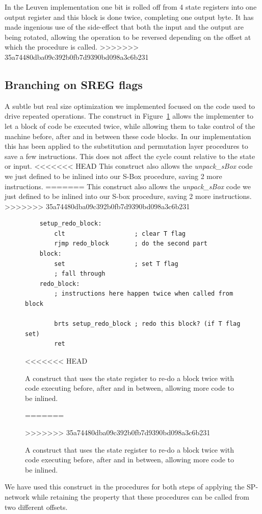 \documentclass[11pt]{article}
\begin{document}
In the Leuven implementation one bit is rolled off from 4 state registers into one output register and this block is done twice, completing one output byte. It has made ingenious use of the side-effect that both the input and the output are being rotated, allowing the operation to be reversed depending on the offset at which the procedure is called.
>>>>>>> 35a74480dba09c392b0fb7d9390bd098a3c6b231

\subsection{Branching on SREG flags}
A subtle but real size optimization we implemented focused on the code used to drive repeated operations.
The construct in Figure~\ref{sreg_redo} allows the implementer to let a block of code be executed twice, while allowing them to take control of the machine before, after and in between these code blocks.
In our implementation this has been applied to the substitution and permutation layer procedures to save a few instructions.
This does not affect the cycle count relative to the state or input.
<<<<<<< HEAD
This construct also allows the \textit{unpack\_sBox} code we just defined to be inlined into our S-Box procedure, saving 2 more instructions.
=======
This construct also allows the \textit{unpack\_sBox} code we just defined to be inlined into our S-box procedure, saving 2 more instructions.
>>>>>>> 35a74480dba09c392b0fb7d9390bd098a3c6b231

\begin{figure}
	\begin{lstlisting}
	setup_redo_block:
		clt                   ; clear T flag
		rjmp redo_block       ; do the second part
	block:
		set                   ; set T flag
		; fall through
	redo_block:
		; instructions here happen twice when called from block

		brts setup_redo_block ; redo this block? (if T flag set)
		ret
	\end{lstlisting}
<<<<<<< HEAD
	\caption{\footnotesize A construct that uses the state register to re-do a block twice with code executing before, after and in between, allowing more code to be inlined.}
=======
	\caption{A construct that uses the state register to re-do a block twice with code executing before, after and in between, allowing more code to be inlined.}
>>>>>>> 35a74480dba09c392b0fb7d9390bd098a3c6b231
\label{sreg_redo}
\end{figure}

We have used this construct in the procedures for both steps of applying the SP-network while retaining the property that these procedures can be called from two different offsets.
\end{document}
